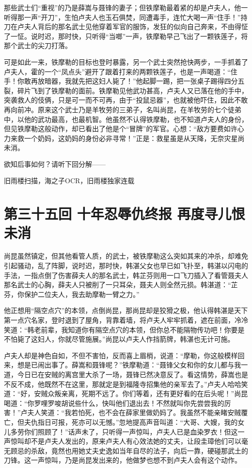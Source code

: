 \documentclass[12pt,oneside]{book}
\begin{document}
那些武士们``重视''的乃是薛嵩与聂锋的妻子；但铁摩勒最着紧的却是卢夫人，他一听得那一声``开刀''，生怕卢夫人也玉石俱焚，同遭毒手，连忙大喝一声``住手！''持刀在卢夫人背后的那名武士见他穿着军官的服饰，发狂的似向自己奔来，不由得怔了一怔。说时迟，那时快，只听得``当啷''一声，铁摩勒早己飞出了一颗铁莲子，将那个武士的尖刀打落。

可是如此一来，铁摩勒的目标也登时暴露，另一个武士突然抢快两步，一手抓着了卢夫人，霍的一个``凤点头''避开了跟着打来的两颗铁莲子，也是一声喝道：``住手！你敢再放暗器，我就先把这妇人毙了！''他起脚一踢，把一张桌子踢得四分五裂，碎片飞到了铁摩勒的面前。铁摩勒见他武功甚高，卢夫人又已落在他的手中，突袭救人的伎俩，只是可一而不可再，由于``投鼠忌器''，也就被他吓住，因此不敢再向前冲。原来这个武士乃是羊牧劳的三弟子，名叫尚昆，在羊牧劳的七个徒弟中，以他的武功最高，也最机智。他虽然不认得铁摩勒，也不知道卢夫人的身份，但见铁摩勒这般动作，却已看出了他是个``冒牌''的军官。心想：``敌方要费如许心力来救一个奶妈，这奶妈的身份必非寻常！''正是：救星虽是从天降，无奈灾星尚未消。

欲知后事如何？请听下回分解------

旧雨楼扫描，海之子OCR，旧雨楼独家连载

\chapter{第三十五回 十年忍辱仇终报
再度寻儿恨未消}\label{ux7b2cux4e09ux5341ux4e94ux56de-ux5341ux5e74ux5fcdux8fb1ux4ec7ux7ec8ux62a5-ux518dux5ea6ux5bfbux513fux6068ux672aux6d88}

尚昆虽然镇定，但其他看管人质，的武士，被铁摩勒这么突如其来的冲杀，却难免引起骚动，乱了阵脚，说时迟，那时快，韩湛父女也早已如飞扑至，韩湛以闪电的手法，一指点倒了伤害薛夫人的那名武士，韩芷芬则用一口飞刀插入了看管聂夫人那名武士的心胸，薛夫人只被削了一只耳朵，聂夫人则全然元损。韩湛道：``芷芬，你保护二位夫人，我去助摩勒一臂之力。''

他正想用``隔空点穴''的本领，点倒尚昆，那尚昆却是狡猾之极，他认得韩湛是天下第一点穴名家，登时退到了屋角，背靠着墙，将卢夫人牢牢抓着，遮在前面，冷冷笑道：``韩老前辈，我知道你有隔空点穴的本领，但你总不能隔物传功吧！你要是不怕毙了这妇人，你就尽管施展。''尚昆以卢夫人作挡箭牌，韩湛也无计可施。

卢夫人却是神色自如，不但不害怕，反而喜上眉梢，说道：``摩勒，你这般模样回来，想是已闹出事了。薛嵩和聂锋呢？''铁摩勒道：``聂锋父女和你的女儿都与我一道，今日已在安贼的离宫里大杀了一场，聂锋已然决意反了。看这情势，薛嵩也是不反不成，他既然不在这里，那就定是到福隆寺招集他的亲军去了。''卢夫人哈哈笑道：``好，安贼众叛亲离，死期不远了。你们等着，还有更好看的在后头呢！''尚昆喝道：``你罗哩罗唆胡说些什么，快叫他们退出去！不然就叫你先尝尝我的厉害！''卢夫人笑道：``我若怕死，也不会在薛家里做奶妈了。我虽然不能亲睹安贼覆亡，但夫仇指日可报，死亦可以无憾。''忽地提高声音叫道：``大哥、大嫂，我的女儿多劳你们照顾了！''话声未了，只听得一声惊叫，卢夫人已是血染罗衣！但这一声惊叫却不是卢夫人发出的，原来卢夫人有心效法她的丈夫，让段圭璋他们可以毫无顾忌的杀敌，竟然也用她丈夫史逸如当年自尽的法子，向后一靠，硬碰那武土的刀锋。这一声惊叫，乃是尚昆发出来的，他做梦也想不到卢夫人会有这个动作。
\end{document}
